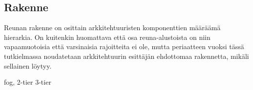 \subsection{Rakenne}
Reunan rakenne on osittain arkkitehtuuristen komponenttien määräämä hierarkia. On kuitenkin huomattava että osa reuna-alustoista on niin vapaamuotoisia että varsinaisia rajoitteita ei ole, mutta periaatteen vuoksi tässä tutkielmassa noudatetaan arkkitehtuurin esittäjän ehdottomaa rakennetta, mikäli sellainen löytyy.

fog,
2-tier
3-tier